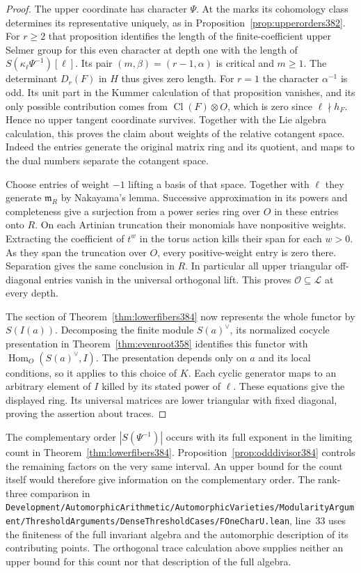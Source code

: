 \documentclass[a4paper,11pt]{article}
\theoremstyle{definition}
\theoremstyle{remark}
\newcommand{\srcloc}[2]{{\small\nolinkurl{#1.lean}}, line~#2}
\numberwithin{equation}{section}
\begin{document}
\begin{proof}
The upper coordinate has character \(\Psi\). At the marks its
cohomology class determines its representative uniquely, as in
Proposition~\ref{prop:upperorders382}. For \(r\ge2\) that
proposition identifies the length of the finite-coefficient
upper Selmer group for this even character at depth one with
the length of \(S(\kappa_\ell\Psi^{-1})[\ell]\). Its pair
\((m,\beta)=(r-1,\alpha)\) is critical and \(m\ge1\).
The determinant \(D_r(F)\) in \(H\) thus gives zero length.
For \(r=1\) the character \(\alpha^{-1}\) is odd. Its unit
part in the Kummer calculation of that proposition vanishes,
and its only possible contribution comes from
\(\operatorname{Cl}(F)\otimes O\), which is zero since
\(\ell\nmid h_F\). Hence no upper tangent coordinate survives.
Together with the Lie algebra calculation, this proves the
claim about weights of the relative cotangent space. Indeed
the entries generate the original matrix ring and its quotient,
and maps to the dual numbers separate the cotangent space.

Choose entries of weight \(-1\) lifting a basis of that space.
Together with \(\ell\) they generate \(\mathfrak m_R\) by
Nakayama's lemma. Successive approximation in its powers and
completeness give a surjection from a power series ring over
\(O\) in these entries onto \(R\). On each Artinian truncation
their monomials have nonpositive weights. Extracting the
coefficient of \(t^w\) in the torus action kills their span
for each \(w>0\). As they span the truncation over \(O\), every
positive-weight entry is zero there. Separation gives the same
conclusion in \(R\). In particular all upper triangular
off-diagonal entries vanish in the universal orthogonal lift.
This proves \(\mathcal O\subseteq\mathcal L\) at every depth.

The section of Theorem~\ref{thm:lowerfibers384} now represents
the whole functor by \(S(I(a))\). Decomposing the finite module
\(S(a)^\vee\), its normalized cocycle presentation in
Theorem~\ref{thm:evenroot358} identifies this functor with
\(\operatorname{Hom}_O(S(a)^\vee,I)\). The presentation depends
only on \(a\) and its local conditions, so it applies to this
choice of \(K\). Each cyclic generator maps to an arbitrary
element of \(I\) killed by its stated power of \(\ell\).
These equations give the displayed ring. Its universal
matrices are lower triangular with fixed diagonal, proving
the assertion about traces.
\end{proof}

The complementary order \(|S(\Psi^{-1})|\) occurs with its full
exponent in the limiting count in Theorem~\ref{thm:lowerfibers384}.
Proposition~\ref{prop:odddivisor384} controls the remaining
factors on the very same interval. An upper bound for the count
itself would therefore give information on the complementary
order. The rank-three comparison in
\srcloc{Development/AutomorphicArithmetic/AutomorphicVarieties/ModularityArgument/ThresholdArguments/DenseThresholdCases/FOneCharU}{33}
uses the finiteness of the full invariant algebra and the
automorphic description of its contributing points. The
orthogonal trace calculation above supplies neither an upper
bound for this count nor that description of the full algebra.
\end{document}
